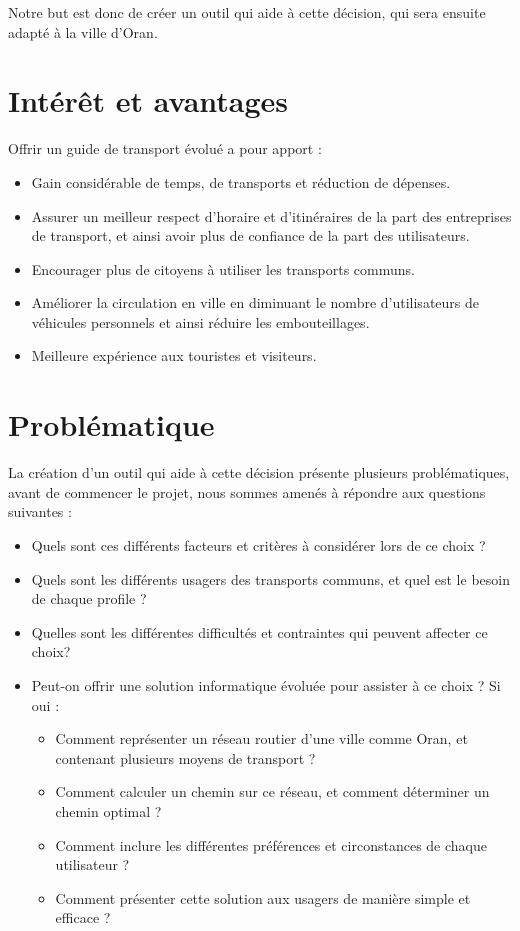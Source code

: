 Notre but est donc de créer un outil qui aide à cette décision, qui sera ensuite adapté à la ville d’Oran.

\section{Intérêt et avantages}
Offrir un guide de transport évolué a pour apport :
\begin{itemize}
	\item Gain considérable de temps, de transports et réduction de dépenses.
	\item Assurer un meilleur respect d'horaire et d'itinéraires de la part des entreprises de transport, et ainsi avoir plus de confiance de la part des utilisateurs.
	\item Encourager plus de citoyens à utiliser les transports communs.
	\item Améliorer la circulation en ville en diminuant le nombre d'utilisateurs de véhicules personnels et ainsi réduire les embouteillages.
	\item Meilleure expérience aux touristes et visiteurs.
\end{itemize}

\section{Problématique}

La création d'un outil qui aide à cette décision présente plusieurs problématiques, avant de commencer le projet, nous sommes amenés à répondre aux questions suivantes :
\begin{itemize}
	\item Quels sont ces différents facteurs et critères à considérer lors de ce choix ?
	\item Quels sont les différents usagers des transports communs, et quel est le besoin de chaque profile ?
	\item Quelles sont les différentes difficultés et contraintes qui peuvent affecter ce choix?
	\item Peut-on offrir une solution informatique évoluée pour assister à ce choix ? Si oui : 
	      \begin{itemize}
	      	\item Comment représenter un réseau routier d'une ville comme Oran, et contenant plusieurs moyens de transport ?
	      	\item Comment calculer un chemin sur ce réseau, et comment déterminer un chemin optimal ?
	      	\item Comment inclure les différentes préférences et circonstances de chaque utilisateur ?
	      	\item Comment présenter cette solution aux usagers de manière simple et efficace ?
	      \end{itemize}
\end{itemize}
			

